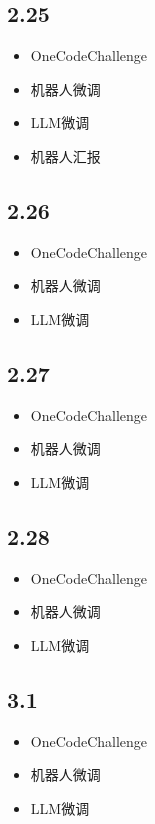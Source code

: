 \documentclass[UTF8]{ctexart}
\begin{document}
\subsection*{2.25}
\begin{itemize}
    \item OneCodeChallenge
    \item 机器人微调
    \item LLM微调
    \item 机器人汇报
\end{itemize}

\subsection*{2.26}
\begin{itemize}
    \item OneCodeChallenge
    \item 机器人微调
    \item LLM微调
\end{itemize}

\subsection*{2.27}
\begin{itemize}
    \item OneCodeChallenge
    \item 机器人微调
    \item LLM微调
\end{itemize}

\subsection*{2.28}
\begin{itemize}
    \item OneCodeChallenge
    \item 机器人微调
    \item LLM微调
\end{itemize}

\subsection*{3.1}
\begin{itemize}
    \item OneCodeChallenge
    \item 机器人微调
    \item LLM微调
\end{itemize}
\end{document}
